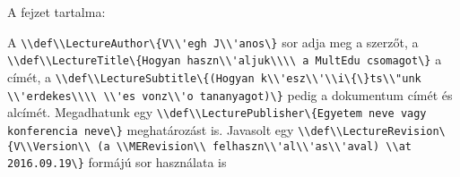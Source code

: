 {
A fejzet tartalma:

A \lstinline|\\def\\LectureAuthor\{V\\'egh J\\'anos\}| sor adja meg a szerzőt,
a \lstinline|\\def\\LectureTitle\{Hogyan haszn\\'aljuk\\\\ a MultEdu csomagot\}|
a címét, a \lstinline|\\def\\LectureSubtitle\{(Hogyan k\\'esz\\'\\i\{\}ts\\"unk \\'erdekes\\\\ \\'es vonz\\'o tananyagot)\}| pedig a dokumentum címét és alcímét.
Megadhatunk egy \lstinline|\\def\\LecturePublisher\{Egyetem neve vagy konferencia neve\}| meghatározást is.
Javasolt egy \lstinline|\\def\\LectureRevision\{V\\Version\\ (a \\MERevision\\ felhaszn\\'al\\'as\\'aval) \\at 2016.09.19\}| formájú sor használata is

}

